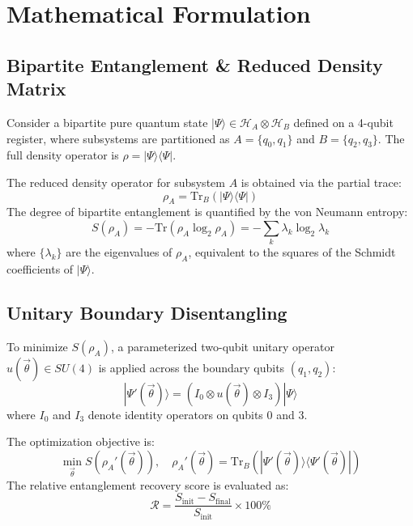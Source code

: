 \documentclass[conference]{IEEEtran}
\begin{document}
\section{Mathematical Formulation}

\subsection{Bipartite Entanglement \& Reduced Density Matrix}
Consider a bipartite pure quantum state $|\Psi\rangle \in \mathcal{H}_A \otimes \mathcal{H}_B$ defined on a 4-qubit register, where subsystems are partitioned as $A = \{q_0, q_1\}$ and $B = \{q_2, q_3\}$. The full density operator is $\rho = |\Psi\rangle\langle\Psi|$.

The reduced density operator for subsystem $A$ is obtained via the partial trace:
\begin{equation}
\rho_A = \text{Tr}_B(|\Psi\rangle\langle\Psi|)
\end{equation}
The degree of bipartite entanglement is quantified by the von Neumann entropy:
\begin{equation}
S(\rho_A) = -\text{Tr}(\rho_A \log_2 \rho_A) = -\sum_{k} \lambda_k \log_2 \lambda_k
\end{equation}
where $\{\lambda_k\}$ are the eigenvalues of $\rho_A$, equivalent to the squares of the Schmidt coefficients of $|\Psi\rangle$.

\subsection{Unitary Boundary Disentangling}
To minimize $S(\rho_A)$, a parameterized two-qubit unitary operator $u(\vec{\theta}) \in SU(4)$ is applied across the boundary qubits $(q_1, q_2)$:
\begin{equation}
|\Psi'(\vec{\theta})\rangle = (I_0 \otimes u(\vec{\theta}) \otimes I_3) |\Psi\rangle
\end{equation}
where $I_0$ and $I_3$ denote identity operators on qubits $0$ and $3$.

The optimization objective is:
\begin{equation}
\min_{\vec{\theta}} S(\rho_A'(\vec{\theta})), \quad \rho_A'(\vec{\theta}) = \text{Tr}_B(|\Psi'(\vec{\theta})\rangle\langle\Psi'(\vec{\theta})|)
\end{equation}
The relative entanglement recovery score is evaluated as:
\begin{equation}
\mathcal{R} = \frac{S_{\text{init}} - S_{\text{final}}}{S_{\text{init}}} \times 100\%
\end{equation}
\end{document}
